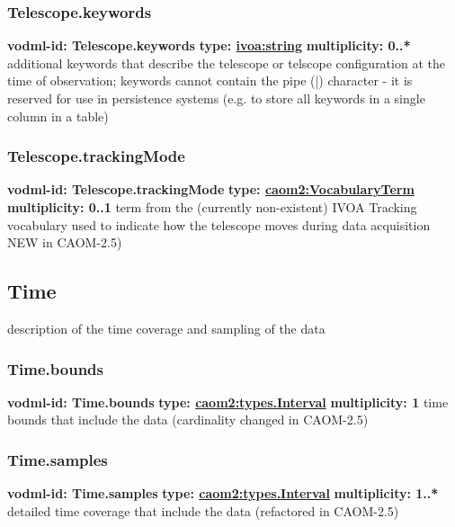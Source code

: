     \subsubsection{Telescope.keywords}
      \textbf{vodml-id: Telescope.keywords} \newline
      \textbf{type: \hyperref[sect:ivoa]{ivoa:string}} \newline
      \textbf{multiplicity: 0..*} \newline
      additional keywords that describe the telescope or telscope configuration at the time of observation; keywords cannot contain the pipe (|) character - it is reserved for use in persistence systems (e.g. to store all keywords in a single column in a table)

    \subsubsection{Telescope.trackingMode}
      \textbf{vodml-id: Telescope.trackingMode} \newline
      \textbf{type: \hyperref[sect:VocabularyTerm]{caom2:VocabularyTerm}} \newline
      \textbf{multiplicity: 0..1} \newline
      term from the (currently non-existent) IVOA Tracking vocabulary used to indicate how the telescope moves during data acquisition NEW in CAOM-2.5)

  \subsection{Time}
  \label{sect:Time}
    description of the time coverage and sampling of the data

    \subsubsection{Time.bounds}
      \textbf{vodml-id: Time.bounds} \newline
      \textbf{type: \hyperref[sect:types.Interval]{caom2:types.Interval}} \newline
      \textbf{multiplicity: 1} \newline
      time bounds that include the data (cardinality changed in CAOM-2.5)

    \subsubsection{Time.samples}
      \textbf{vodml-id: Time.samples} \newline
      \textbf{type: \hyperref[sect:types.Interval]{caom2:types.Interval}} \newline
      \textbf{multiplicity: 1..*} \newline
      detailed time coverage that include the data (refactored in CAOM-2.5)

